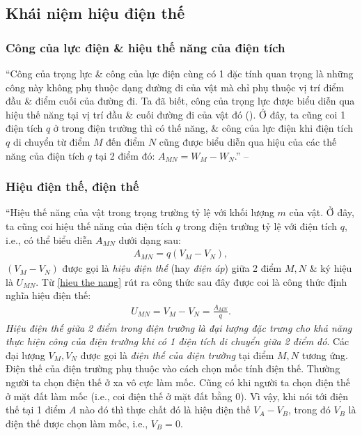 \documentclass[oneside]{book}
\numberwithin{equation}{section}
\begin{document}
\subsection{Khái niệm hiệu điện thế}

\subsubsection{Công của lực điện \& hiệu thế năng của điện tích}
``Công của trọng lực \& công của lực điện cùng có 1 đặc tính quan trọng là những công này không phụ thuộc dạng đường đi của vật mà chỉ phụ thuộc vị trí điểm đầu \& điểm cuối của đường đi. Ta đã biết, công của trọng lực được biểu diễn qua hiệu thế năng tại vị trí đầu \& cuối đường đi của vật đó (\cite[\S35, pp. 164--166]{SGK_Vat_Ly_10_nang_cao}). Ở đây, ta cũng coi 1 điện tích $q$ ở trong điện trường thì có thế năng, \& công của lực điện khi điện tích $q$ di chuyển từ điểm $M$ đến điểm $N$ cũng được biểu diễn qua hiệu của các thế năng của điện tích $q$ tại 2 điểm đó: $A_{MN} = W_M - W_N$.'' -- \cite[p. 20]{SGK_Vat_Ly_11_nang_cao}

\subsubsection{Hiệu điện thế, điện thế}
``Hiệu thế năng của vật trong trọng trường tỷ lệ với khối lượng $m$ của vật. Ở đây, ta cũng coi hiệu thế năng của điện tích $q$ trong điện trường tỷ lệ với điện tích $q$, i.e., có thể biểu diễn $A_{MN}$ dưới dạng sau:
\begin{align}
	\label{hieu the nang}
	A_{MN} = q(V_M - V_N),
\end{align}
$(V_M - V_N)$ được gọi là \textit{hiệu điện thế} (hay \textit{điện áp}) giữa 2 điểm $M,N$ \& ký hiệu là $U_{MN}$. Từ \eqref{hieu the nang} rút ra công thức sau đây được coi là công thức định nghĩa hiệu điện thế:
\begin{align}
	\label{hieu dien the}
	U_{MN} = V_M - V_N = \frac{A_{MN}}{q}.
\end{align}
\textit{Hiệu điện thế giữa 2 điểm trong điện trường là đại lượng đặc trưng cho khả năng thực hiện công của điện trường khi có 1 điện tích di chuyển giữa 2 điểm đó}. Các đại lượng $V_M,V_N$ được gọi là \textit{điện thế của điện trường} tại điểm $M,N$ tương ứng. Điện thế của điện trường phụ thuộc vào cách chọn mốc tính điện thế. Thường người ta chọn điện thế ở xa vô cực làm mốc. Cũng có khi người ta chọn điện thế ở mặt đất làm mốc (i.e., coi điện thế ở mặt đất bằng $0$). Vì vậy, khi nói tới điện thế tại 1 điểm $A$ nào đó thì thực chất đó là hiệu điện thế $V_A - V_B$, trong đó $V_B$ là điện thế được chọn làm mốc, i.e., $V_B = 0$.
\end{document}
